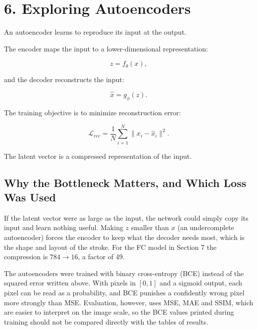 \documentclass[10pt]{article}
\begin{document}
\section*{6. Exploring Autoencoders}

An autoencoder learns to reproduce its input at the output.

The encoder maps the input to a lower-dimensional representation:

\[
z=f_{\theta}(x),
\]

and the decoder reconstructs the input:

\[
\hat{x}=g_{\phi}(z).
\]

The training objective is to minimize reconstruction error:

\[
\mathcal{L}_{rec}
=
\frac{1}{N}\sum_{i=1}^{N}
\|x_i-\hat{x}_i\|^2.
\]

\begin{center}
\end{center}

The latent vector is a compressed representation of the input.

\subsection*{Why the Bottleneck Matters, and Which Loss Was Used}

If the latent vector were as large as the input, the network could simply copy
its input and learn nothing useful. Making $z$ smaller than $x$ (an undercomplete
autoencoder) forces the encoder to keep what the decoder needs most, which is
the shape and layout of the stroke. For the FC model in Section 7 the
compression is $784\rightarrow16$, a factor of 49.

The autoencoders were trained with binary cross-entropy (BCE) instead of the
squared error written above. With pixels in $[0,1]$ and a sigmoid output, each
pixel can be read as a probability, and BCE punishes a confidently wrong pixel
more strongly than MSE. Evaluation, however, uses MSE, MAE and SSIM, which are
easier to interpret on the image scale, so the BCE values printed during
training should not be compared directly with the tables of results.
\end{document}
